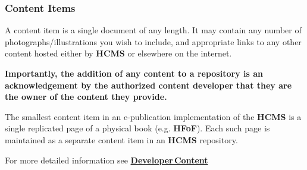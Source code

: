 \documentclass[12pt]{article}
\begin{document}
\subsubsection{Content Items}

A content item is a single document of any length. It may contain any number of photographs/illustrations you wish to include, and appropriate links to any other content hosted either by {\bf \small HCMS} or elsewhere on the internet.

{\bf Importantly, the addition of any content to a repository is an acknowledgement by the authorized content developer that they are the owner of the content they provide.} 

The smallest content item in an e-publication implementation of the {\bf \small HCMS} is a single replicated page of a physical book (e.g. {\bf \small HFoF}). Each such page is maintained as a separate content item in an {\bf \small HCMS} repository.

For more detailed information see \href{../developer-content/developer-content.tex}{\bf Developer\,Content}



\end{document}

